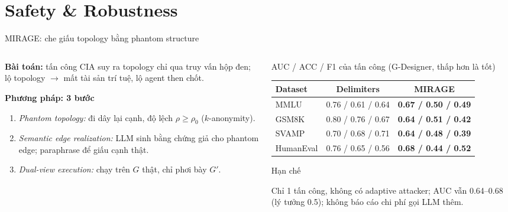\documentclass[aspectratio=169,10pt]{beamer}
\begin{document}
\section{Safety \& Robustness}

\begin{frame}{MIRAGE: che giấu topology bằng phantom structure}
  \begin{columns}[T]
    \begin{column}{0.42\textwidth}
      \textbf{Bài toán:} tấn công CIA suy ra topology chỉ qua truy vấn hộp đen;
      lộ topology $\to$ mất tài sản trí tuệ, lộ agent then chốt.
      \vspace{4pt}

      \textbf{Phương pháp: 3 bước}
      \begin{enumerate}
        \item \emph{Phantom topology:} đi dây lại cạnh, độ lệch $\rho \ge \rho_0$ ($k$-anonymity).
        \item \emph{Semantic edge realization:} LLM sinh bằng chứng giả cho phantom edge; paraphrase để giấu cạnh thật.
        \item \emph{Dual-view execution:} chạy trên $G$ thật, chỉ phơi bày $G'$.
      \end{enumerate}
    \end{column}
    \begin{column}{0.56\textwidth}
      \centering
      {\small AUC / ACC / F1 của tấn công (G-Designer, thấp hơn là tốt)\par}
      \vspace{3pt}
      \footnotesize
      \begin{tabular}{@{}l c c@{}}
        \toprule
        Dataset & Delimiters & MIRAGE \\
        \midrule
        MMLU      & 0.76 / 0.61 / 0.64 & \textbf{0.67 / 0.50 / 0.49} \\
        GSM8K     & 0.80 / 0.76 / 0.67 & \textbf{0.64 / 0.51 / 0.42} \\
        SVAMP     & 0.70 / 0.68 / 0.71 & \textbf{0.64 / 0.48 / 0.39} \\
        HumanEval & 0.76 / 0.65 / 0.56 & \textbf{0.68 / 0.44 / 0.52} \\
        \bottomrule
      \end{tabular}
      \vspace{6pt}
      \begin{alertblock}{Hạn chế}
        \raggedright
        Chỉ 1 tấn công, không có adaptive attacker; AUC vẫn 0.64--0.68 (lý tưởng 0.5);
        không báo cáo chi phí gọi LLM thêm.
      \end{alertblock}
    \end{column}
  \end{columns}
\end{frame}
\end{document}
